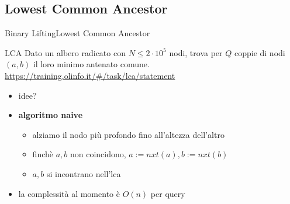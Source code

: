 \documentclass[compress]{beamer}
\begin{document}
\subsection{Lowest Common Ancestor}
\begin{frame}{Binary Lifting}{Lowest Common Ancestor}
    \begin{exampleblock}{LCA}
    Dato un albero radicato con $N \leq 2 \cdot 10^5$ nodi, trova per $Q$ coppie di nodi $(a, b)$ il loro minimo antenato comune.
        \vfill
        \small{\underline{\url{https://training.olinfo.it/\#/task/lca/statement}}}
    \end{exampleblock}
    \pause
    \begin{itemize}
        \item idee?
        \pause
        \item \textbf{algoritmo naive}
            \begin{itemize}
                \item alziamo il nodo pi\`u profondo fino all'altezza dell'altro
                \item finch\`e $a, b$ non coincidono, $a := nxt(a), b := nxt(b)$
                \item $a,b$ si incontrano nell'lca
            \end{itemize}
        \pause
    \item la complessit\`a al momento \`e $O(n)$ per query
    \end{itemize}
\end{frame}
\end{document}
